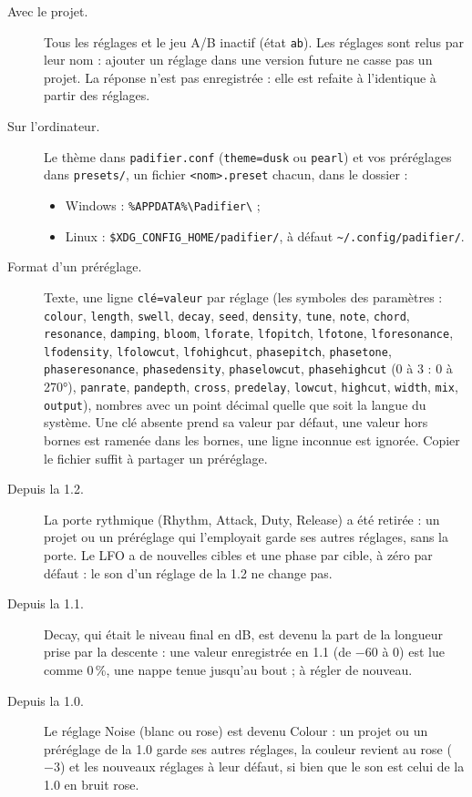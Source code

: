 \documentclass[a4paper,11pt]{article}
\begin{document}
\begin{description}
\item[Avec le projet.] Tous les réglages et le jeu A/B inactif (état \texttt{ab}). Les réglages
  sont relus par leur nom : ajouter un réglage dans une version future ne casse pas un projet. La
  réponse n'est pas enregistrée : elle est refaite à l'identique à partir des réglages.
\item[Sur l'ordinateur.] Le thème dans \texttt{padifier.conf} (\texttt{theme=dusk} ou
  \texttt{pearl}) et vos préréglages dans \texttt{presets/}, un fichier \texttt{<nom>.preset}
  chacun, dans le dossier :
  \begin{itemize}
  \item Windows : \verb|%APPDATA%\Padifier\| ;
  \item Linux : \verb|$XDG_CONFIG_HOME/padifier/|, à défaut \verb|~/.config/padifier/|.
  \end{itemize}
\item[Format d'un préréglage.] Texte, une ligne \texttt{clé=valeur} par réglage (les symboles
  des paramètres : \texttt{colour}, \texttt{length}, \texttt{swell}, \texttt{decay},
  \texttt{seed}, \texttt{density}, \texttt{tune}, \texttt{note}, \texttt{chord},
  \texttt{resonance}, \texttt{damping}, \texttt{bloom}, \texttt{lforate}, \texttt{lfopitch},
  \texttt{lfotone}, \texttt{lforesonance}, \texttt{lfodensity}, \texttt{lfolowcut},
  \texttt{lfohighcut}, \texttt{phasepitch}, \texttt{phasetone}, \texttt{phaseresonance},
  \texttt{phasedensity}, \texttt{phaselowcut}, \texttt{phasehighcut} (0 à 3 : 0 à 270°),
  \texttt{panrate}, \texttt{pandepth},
  \texttt{cross}, \texttt{predelay}, \texttt{lowcut}, \texttt{highcut}, \texttt{width},
  \texttt{mix}, \texttt{output}), nombres avec un point décimal quelle que soit la langue du
  système. Une clé absente prend sa valeur par défaut, une valeur hors bornes est ramenée dans les
  bornes, une ligne inconnue est ignorée. Copier le fichier suffit à partager un préréglage.
\item[Depuis la 1.2.] La porte rythmique (Rhythm, Attack, Duty, Release) a été retirée : un
  projet ou un préréglage qui l'employait garde ses autres réglages, sans la porte. Le LFO a de
  nouvelles cibles et une phase par cible, à zéro par défaut : le son d'un réglage de la 1.2 ne
  change pas.
\item[Depuis la 1.1.] Decay, qui était le niveau final en dB, est devenu la part de la longueur
  prise par la descente : une valeur enregistrée en 1.1 (de $-60$ à 0) est lue comme 0\,\%, une
  nappe tenue jusqu'au bout ; à régler de nouveau.
\item[Depuis la 1.0.] Le réglage Noise (blanc ou rose) est devenu Colour : un projet ou un
  préréglage de la 1.0 garde ses autres réglages, la couleur revient au rose ($-3$) et les
  nouveaux réglages à leur défaut, si bien que le son est celui de la 1.0 en bruit rose.
\end{description}
\end{document}
